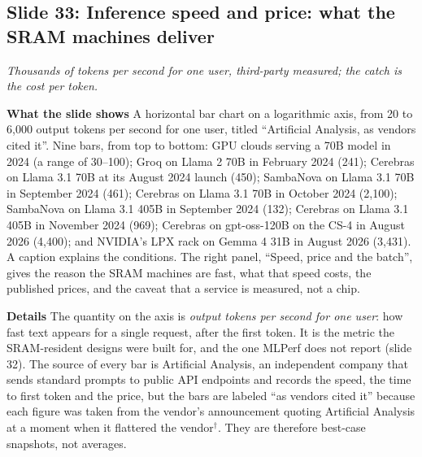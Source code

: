 \documentclass[11pt,letterpaper]{article}
\newcommand{\slide}[3]{%
  \subsection[Slide #1: #2]{Slide #1: #2}%
  {\color{muted}\itshape #3\par}\medskip}
\newcommand{\para}[1]{\medskip\noindent\textbf{#1}\quad}
\begin{document}
\slide{33}{Inference speed and price: what the SRAM machines deliver}{Thousands of tokens per second for one user, third-party measured; the catch is the cost per token.}

\para{What the slide shows} A horizontal bar chart on a logarithmic axis, from 20 to 6{,}000 output tokens per second for one user, titled ``Artificial Analysis, as vendors cited it''. Nine bars, from top to bottom: GPU clouds serving a 70B model in 2024 (a range of 30--100); Groq on Llama 2 70B in February 2024 (241); Cerebras on Llama 3.1 70B at its August 2024 launch (450); SambaNova on Llama 3.1 70B in September 2024 (461); Cerebras on Llama 3.1 70B in October 2024 (2{,}100); SambaNova on Llama 3.1 405B in September 2024 (132); Cerebras on Llama 3.1 405B in November 2024 (969); Cerebras on gpt-oss-120B on the CS-4 in August 2026 (4{,}400); and NVIDIA's LPX rack on Gemma 4 31B in August 2026 (3{,}431). A caption explains the conditions. The right panel, ``Speed, price and the batch'', gives the reason the SRAM machines are fast, what that speed costs, the published prices, and the caveat that a service is measured, not a chip.

\para{Details} The quantity on the axis is \emph{output tokens per second for one user}: how fast text appears for a single request, after the first token. It is the metric the SRAM-resident designs were built for, and the one MLPerf does not report (slide 32). The source of every bar is Artificial Analysis, an independent company that sends standard prompts to public API endpoints and records the speed, the time to first token and the price, but the bars are labeled ``as vendors cited it'' because each figure was taken from the vendor's announcement quoting Artificial Analysis at a moment when it flattered the vendor$^\dagger$. They are therefore best-case snapshots, not averages.
\end{document}
